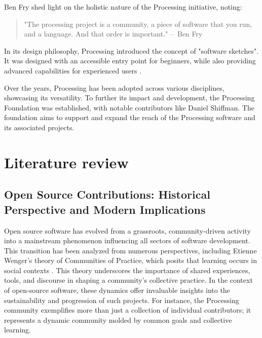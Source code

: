 \documentclass{article}
\begin{document}
Ben Fry shed light on the holistic nature of the Processing initiative, noting:
\begin{quote}
"The processing project is a community, a piece of software that you run, and a language. And that order is important." – Ben Fry \parencite[19:22]{artsatmit2017CASTSymposium2017}
\end{quote}

In its design philosophy, Processing introduced the concept of "software sketches". It was designed with an accessible entry point for beginners, while also providing advanced capabilities for experienced users \parencite{reasProcessingProgrammingMedia2006}.

Over the years, Processing has been adopted across various disciplines, showcasing its versatility. To further its impact and development, the Processing Foundation was established, with notable contributors like Daniel Shiffman. The foundation aims to support and expand the reach of the Processing software and its associated projects.




\section{Literature review}
\subsection{Open Source Contributions: Historical Perspective and Modern Implications}

Open source software has evolved from a grassroots, community-driven activity into a mainstream phenomenon influencing all sectors of software development. This transition has been analyzed from numerous perspectives, including Etienne Wenger's theory of Communities of Practice, which posits that learning occurs in social contexts \parencite{wengerCommunitiesPracticeLearning1998}. This theory underscores the importance of shared experiences, tools, and discourse in shaping a community's collective practice. In the context of open-source software, these dynamics offer invaluable insights into the sustainability and progression of such projects. For instance, the Processing community exemplifies more than just a collection of individual contributors; it represents a dynamic community molded by common goals and collective learning.
\end{document}
